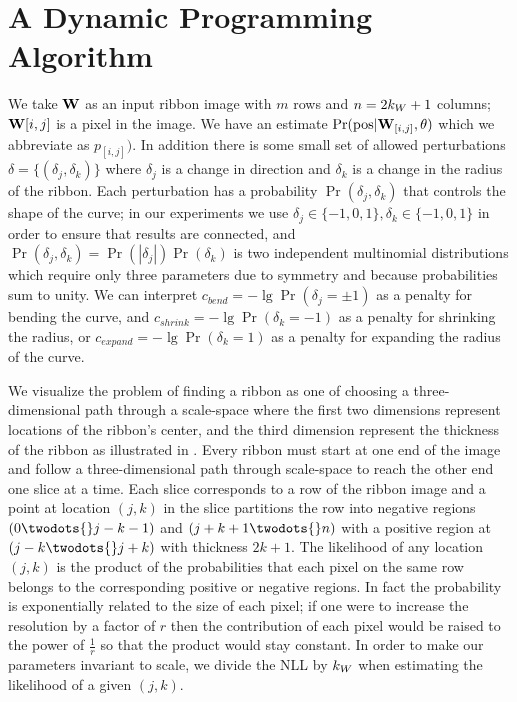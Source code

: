 \section{A Dynamic Programming Algorithm}

We take $\mathbf{W}{}$ as an input ribbon image with $m$ rows and $n=2k_W+1$ columns; $\mathbf{W}{}{[i,j]}$ is a pixel in the image. 
We have an estimate $\Pr(\text{pos}|\mathbf{W}{}_{[i,j]}, \theta)$ which we abbreviate as $p_{[i,j]})$. 
In addition there is some small set of allowed perturbations $\delta=\{(\delta_j, \delta_k)\}$ where $\delta_j$ is a change in direction and $\delta_k$ is a change in the radius of the ribbon. 
Each perturbation has a probability $\Pr(\delta_j, \delta_k)$ that controls the shape of the curve; in our experiments we use $\delta_j\in\{-1,0,1\}, \delta_k\in\{-1, 0,1\}$ in order to ensure that results are connected, and  $\Pr(\delta_j, \delta_k)=\Pr(|\delta_j|)\Pr(\delta_k)$ is two independent multinomial distributions which require only three parameters due to symmetry and because probabilities sum to unity. 
We can interpret $c_\mathit{bend}=-\lg \Pr(\delta_j=\pm1)$ as a penalty for bending the curve, and $c_\mathit{shrink}=-\lg \Pr(\delta_k=-1)$ as a penalty for shrinking the radius, or $c_\mathit{expand} = -\lg \Pr(\delta_k=1)$ as a penalty for expanding the radius of the curve. 


We visualize the problem of finding a ribbon as one of choosing a three-dimensional path through a scale-space where the first two dimensions represent locations of the ribbon's center, and the third dimension represent the thickness of the ribbon as illustrated in . Every ribbon must start at one end of the image and follow a three-dimensional path through scale-space to reach the other end one slice at a time. Each slice corresponds to a row of the ribbon image and a point at location $(j, k)$ in the slice partitions the row into negative regions $(0\twodots{}j-k-1)$ and $(j+k+1\twodots{}n)$ with a positive region at $(j-k \twodots{} j+k)$ with thickness $2k+1$. The likelihood of any location $(j, k)$ is the product of the probabilities that each pixel on the same row belongs to the corresponding positive or negative regions.  In fact the probability is exponentially related to the size of each pixel; if one were to increase the resolution by a factor of $r$ then the contribution of each pixel would be raised to the power of $\frac{1}{r}$ so that the product would stay constant. In order to make our parameters invariant to scale, we divide the \ac{NLL} by $k_W{}$ when estimating the likelihood of a given $(j,k)$. 

